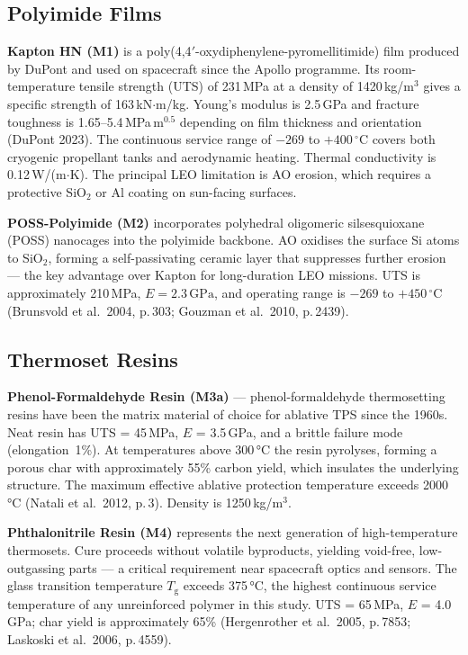 \documentclass[11pt,a4paper]{article}
\begin{document}
\subsection*{Polyimide Films}

\textbf{Kapton HN (M1)} is a poly(4,4$'$-oxydiphenylene-pyromellitimide) film
produced by DuPont and used on spacecraft since the Apollo programme. Its room-temperature
tensile strength (UTS) of 231\,MPa at a density of 1420\,kg/m$^{3}$ gives a
specific strength of 163\,kN$\cdot$m/kg. Young's modulus is 2.5\,GPa and
fracture toughness is 1.65--5.4\,MPa$\,\mathrm{m}^{0.5}$ depending on film
thickness and orientation (DuPont 2023). The continuous service range of
$-269$ to $+400\,^{\circ}$C covers both cryogenic propellant tanks and
aerodynamic heating. Thermal conductivity is 0.12\,W/(m$\cdot$K). The principal
LEO limitation is AO erosion, which requires a protective SiO$_{2}$ or Al
coating on sun-facing surfaces.

\textbf{POSS-Polyimide (M2)} incorporates polyhedral oligomeric silsesquioxane
(POSS) nanocages into the polyimide backbone. AO oxidises the surface Si atoms
to SiO$_{2}$, forming a self-passivating ceramic layer that suppresses further
erosion — the key advantage over Kapton for long-duration LEO missions. UTS is
approximately 210\,MPa, $E = 2.3\,\mathrm{GPa}$, and operating range is
$-269$ to $+450\,^{\circ}$C (Brunsvold et al.\ 2004, p.\,303;
Gouzman et al.\ 2010, p.\,2439).

\subsection*{Thermoset Resins}

\textbf{Phenol-Formaldehyde Resin (M3a)} — phenol-formaldehyde thermosetting resins have been
the matrix material of choice for ablative TPS since the 1960s. Neat resin has
UTS = 45\,MPa, $E$ = 3.5\,GPa, and a brittle failure mode (elongation~1\%). At
temperatures above 300\,°C the resin pyrolyses, forming a porous char with
approximately 55\% carbon yield, which insulates the underlying structure. The
maximum effective ablative protection temperature exceeds 2000\,°C
(Natali et al.\ 2012, p.\,3). Density is 1250\,kg/m$^{3}$.

\textbf{Phthalonitrile Resin (M4)} represents the next generation of
high-temperature thermosets. Cure proceeds without volatile byproducts,
yielding void-free, low-outgassing parts — a critical requirement near spacecraft
optics and sensors. The glass transition temperature $T_{\mathrm{g}}$ exceeds
375\,°C, the highest continuous service temperature of any unreinforced polymer
in this study. UTS = 65\,MPa, $E$ = 4.0\,GPa; char yield is approximately 65\%
(Hergenrother et al.\ 2005, p.\,7853; Laskoski et al.\ 2006, p.\,4559).
\end{document}
